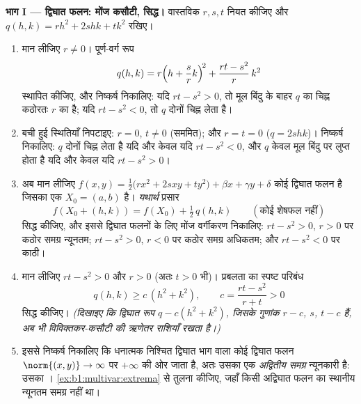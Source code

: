 \begin{problem}
\medskip
\noindent\textbf{भाग I --- द्विघात फलन: मोंज कसौटी, सिद्ध।} वास्तविक $r,
s, t$ नियत कीजिए और $q(h, k) = r h^2 + 2s hk + t k^2$ रखिए।
\begin{enumerate}
  \item मान लीजिए $r \neq 0$। पूर्ण-वर्ग रूप
        \[
        q(h, k) = r\Bigl(h + \frac{s}{r}k\Bigr)^{\!2}
        + \frac{rt - s^2}{r}\,k^2
        \]
        स्थापित कीजिए, और निष्कर्ष निकालिए: यदि $rt - s^2 > 0$, तो मूल
        बिंदु के बाहर $q$ का चिह्न कठोरतः $r$ का है; यदि $rt - s^2 < 0$,
        तो $q$ दोनों चिह्न लेता है।
  \item बची हुई स्थितियाँ निपटाइए: $r = 0$, $t \neq 0$ (सममित); और $r =
        t = 0$ ($q = 2shk$)। निष्कर्ष निकालिए: $q$ दोनों चिह्न लेता है
        यदि और केवल यदि $rt - s^2 < 0$, और $q$ केवल मूल बिंदु पर लुप्त
        होता है यदि और केवल यदि $rt - s^2 > 0$।
  \item अब मान लीजिए $f(x, y) = \frac12\bigl(r x^2 + 2s xy + t
        y^2\bigr) + \beta x + \gamma y + \delta$ कोई द्विघात फलन है
        जिसका एक  $X_0 = (a, b)$ है। \emph{यथार्थ} प्रसार
        \[
        f(X_0 + (h,k)) = f(X_0) + \tfrac12\,q(h, k)
        \qquad (\text{कोई शेषफल नहीं})
        \]
        सिद्ध कीजिए, और इससे द्विघात फलनों के लिए मोंज वर्गीकरण
        निकालिए: $rt - s^2 > 0$, $r > 0$ पर कठोर समग्र न्यूनतम; $rt -
        s^2 > 0$, $r < 0$ पर कठोर समग्र अधिकतम; और $rt - s^2 < 0$ पर
        काठी।
  \item मान लीजिए $rt - s^2 > 0$ और $r > 0$ (अतः $t > 0$ भी)। प्रबलता
        का स्पष्ट परिबंध
        \[
        q(h, k) \geq c\,(h^2 + k^2),
        \qquad
        c = \frac{rt - s^2}{r + t} > 0
        \]
        सिद्ध कीजिए। \emph{(दिखाइए कि द्विघात रूप $q - c(h^2 + k^2)$,
        जिसके गुणांक $r - c$, $s$, $t - c$ हैं, अब भी विविक्तकर-कसौटी
        की ऋणेतर राशियाँ रखता है।)}
  \item इससे निष्कर्ष निकालिए कि धनात्मक निश्चित द्विघात भाग वाला कोई
        द्विघात फलन $\norm{(x,y)} \to \infty$ पर $+\infty$ की ओर जाता
        है, अतः उसका एक \emph{अद्वितीय समग्र} न्यूनकारी है: उसका
        । \cref{ex:b1:multivar:extrema} से तुलना कीजिए,
        जहाँ किसी अद्विघात फलन का स्थानीय न्यूनतम समग्र नहीं था।
\end{enumerate}


\end{problem}
